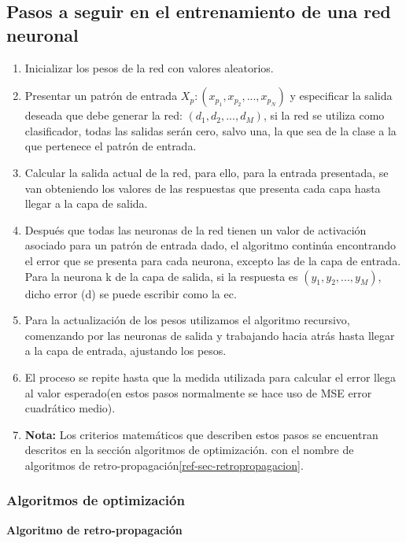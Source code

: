 \subsection{Pasos a seguir en el entrenamiento de una red neuronal}
\begin{enumerate}
    \item Inicializar los pesos de la red con valores aleatorios.
    \item Presentar un patrón de entrada $X_p : (x_{p_1}, x_{p_2}, ...,
        x_{p_N})$ y especificar la salida deseada que debe generar la red:
        $(d_1, d_2,..., d_M)$, si la red se utiliza como clasificador, todas
        las salidas serán cero, salvo una, la que sea de la clase a la que
        pertenece el patrón de entrada.  
    \item Calcular la salida actual de la red, para ello, para la entrada
        presentada, se van obteniendo los valores de las respuestas que
        presenta cada capa hasta llegar a la capa de salida.
    \item Después que todas las neuronas de la red tienen un valor de
        activación asociado para un patrón de entrada dado, el algoritmo
        continúa encontrando el error que se presenta para cada neurona,
        excepto las de la capa de entrada. Para la neurona k de la capa de
        salida, si la respuesta es $(y_1, y_2,..., y_M)$, dicho error (d) se
        puede escribir como la ec. 
    \item Para la actualización de los pesos utilizamos el algoritmo recursivo,
        comenzando por las neuronas de salida y trabajando hacia atrás hasta
        llegar a la capa de entrada, ajustando los pesos.
    \item El proceso se repite hasta que la medida utilizada para calcular el
        error llega al valor esperado(en estos pasos normalmente se hace uso de
        MSE error cuadrático medio).
    \item \textbf{Nota:} Los criterios matemáticos que describen estos pasos se
        encuentran descritos en la sección algoritmos de optimización. con el
        nombre de algoritmos de retro-propagación\ref{ref-sec-retropropagacion}.
\end{enumerate}
\subsubsection{Algoritmos de optimización}
\par\textbf{Algoritmo de retro-propagación \label{ref-sec-retropropagacion}}

